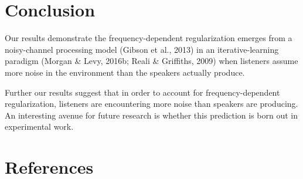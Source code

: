 \documentclass[10pt, letterpaper]{article}
\begin{document}
\hypertarget{conclusion}{%
\section{Conclusion}\label{conclusion}}

Our results demonstrate the frequency-dependent regularization emerges
from a noisy-channel processing model (Gibson et al., 2013) in an
iterative-learning paradigm (Morgan \& Levy, 2016b; Reali \& Griffiths,
2009) when listeners assume more noise in the environment than the
speakers actually produce.

Further our results suggest that in order to account for
frequency-dependent regularization, listeners are encountering more
noise than speakers are producing. An interesting avenue for future
research is whether this prediction is born out in experimental work.

\hypertarget{references}{%
\section{References}\label{references}}

\setlength{\parindent}{-0.1in} 
\setlength{\leftskip}{0.125in}

\noindent
\end{document}
